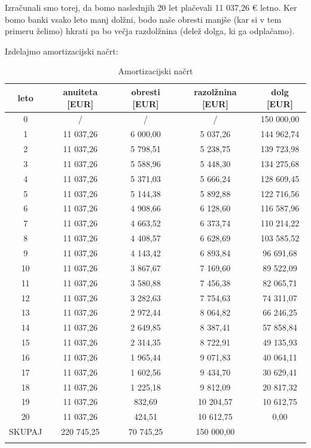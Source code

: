 \documentclass[12pt]{article}
\begin{document}
    Izračunali smo torej, da bomo naslednjih 20 let plačevali 11 037,26 € letno. Ker bomo
    banki vsako leto manj dolžni, bodo naše obresti manjše (kar si v tem primeru želimo)
    hkrati pa bo večja razdolžnina (delež dolga, ki ga odplačamo). 
    
    Izdelajmo amortizacijski načrt:
    \begin{longtable}{|c|c|c|c|c|}
        \hline
        \textbf{leto}   & \textbf{anuiteta [EUR]}  & \textbf{obresti [EUR]}  & \textbf{razolžnina [EUR]} & \textbf{dolg [EUR]} \\ \hline
        \endfirsthead
        \endhead
        0      & /          & /         & /          & 150 000,00 \\ \hline
        1      & 11 037,26  & 6 000,00  & 5 037,26   & 144 962,74 \\ \hline
        2      & 11 037,26  & 5 798,51  & 5 238,75   & 139 723,98 \\ \hline
        3      & 11 037,26  & 5 588,96  & 5 448,30   & 134 275,68 \\ \hline
        4      & 11 037,26  & 5 371,03  & 5 666,24   & 128 609,45 \\ \hline
        5      & 11 037,26  & 5 144,38  & 5 892,88   & 122 716,56 \\ \hline \hline 
        6      & 11 037,26  & 4 908,66  & 6 128,60   & 116 587,96 \\ \hline
        7      & 11 037,26  & 4 663,52  & 6 373,74   & 110 214,22 \\ \hline
        8      & 11 037,26  & 4 408,57  & 6 628,69   & 103 585,52 \\ \hline
        9      & 11 037,26  & 4 143,42  & 6 893,84   & 96 691,68  \\ \hline 
        10     & 11 037,26  & 3 867,67  & 7 169,60   & 89 522,09  \\ \hline \hline
        11     & 11 037,26  & 3 580,88  & 7 456,38   & 82 065,71  \\ \hline
        12     & 11 037,26  & 3 282,63  & 7 754,63   & 74 311,07  \\ \hline
        13     & 11 037,26  & 2 972,44  & 8 064,82   & 66 246,25  \\ \hline
        14     & 11 037,26  & 2 649,85  & 8 387,41   & 57 858,84  \\ \hline
        15     & 11 037,26  & 2 314,35  & 8 722,91   & 49 135,93  \\ \hline \hline
        16     & 11 037,26  & 1 965,44  & 9 071,83   & 40 064,11  \\ \hline
        17     & 11 037,26  & 1 602,56  & 9 434,70   & 30 629,41  \\ \hline
        18     & 11 037,26  & 1 225,18  & 9 812,09   & 20 817,32  \\ \hline
        19     & 11 037,26  & 832,69    & 10 204,57  & 10 612,75  \\ \hline
        20     & 11 037,26  & 424,51    & 10 612,75  & 0,00      \\ \hline \hline
        SKUPAJ & 220 745,25 & 70 745,25 & 150 000,00 &           \\ \hline
        \caption{Amortizacijski načrt}
    \end{longtable}
\end{document}
